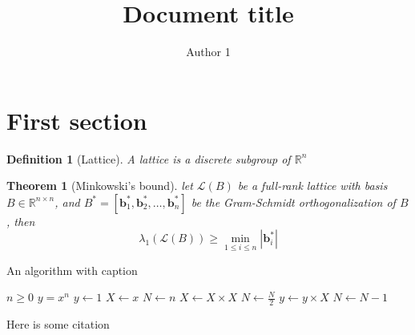 \documentclass{article}
\title{
    Document title
}
\author{
    Author 1
}
\newcommand{\norm}[1]{\left\lvert {#1} \right\rvert}
\newtheorem{definition}{Definition}[section]
\newtheorem{theorem}{Theorem}[section]
\begin{document}
\maketitle

\section{First section}
\begin{definition}[Lattice]\label{lattice-def}
A lattice is a discrete subgroup of $\mathbb{R}^n$
\end{definition}

\begin{theorem}[Minkowski's bound]
    let $\mathcal{L}(B)$ be a full-rank lattice with basis $B \in \mathbb{R}^{n \times n}$, and $B^\ast = [\mathbf{b}_1^\ast, \mathbf{b}_2^\ast, \ldots, \mathbf{b}_n^\ast]$ be the Gram-Schmidt orthogonalization of $B$, then
    \begin{equation}
        \lambda_1(\mathcal{L}(B)) \geq \min_{1 \leq i \leq n}\norm{\mathbf{b}_i^\ast}
    \end{equation}
\end{theorem}

\begin{algorithm}
    \caption{An algorithm with caption}\label{alg:cap}
    \begin{algorithmic}
        \Require $n \geq 0$
        \Ensure $y = x^n$
        \State $y \gets 1$
        \State $X \gets x$
        \State $N \gets n$
                \State $X \gets X \times X$
                \State $N \gets \frac{N}{2}$  
                \State $y \gets y \times X$
                \State $N \gets N - 1$
            \EndIf
        \EndWhile
    \end{algorithmic}
\end{algorithm}

Here is some citation\cite{fujisaki1999secure}



\end{document}
